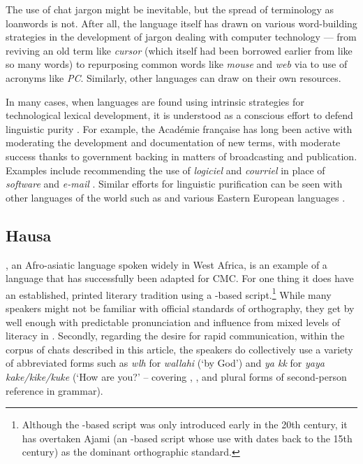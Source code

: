 \documentclass[output=paper
,newtxmath
,modfonts
,nonflat]{langsci/langscibook}
\begin{document}
The use of chat jargon might be inevitable, but the spread of terminology as loanwords is not. After all, the  language itself has drawn on various word-building strategies in the development of jargon dealing with computer technology — from reviving an old term like \textit{cursor} (which itself had been borrowed earlier from  like so many  words) to repurposing common words like \textit{mouse} and \textit{web} via  to use of acronyms like \textit{PC}. Similarly, other languages can draw on their own resources.

In many cases, when languages are found using intrinsic strategies for technological lexical development, it is understood as a conscious effort to defend linguistic purity \citep{blommaert2002,haspelmath2009}. For example, the Académie française has long been active with moderating the development and documentation of new  terms, with moderate success thanks to government backing in matters of broadcasting and publication. Examples include recommending the use of \textit{logiciel} and \textit{courriel} in place of \textit{software} and \textit{e-mail} \citep{daulton2012}. Similar efforts for linguistic purification can be seen with other languages of the world such as  and various Eastern European languages \citep{haspelmath2009}.

\subsection{Hausa}

, an Afro-asiatic language spoken widely in West Africa, is an example of a language that has successfully been adapted for CMC. For one thing it does have an established, printed literary tradition using a -based script.\footnote{Although the -based script was only introduced early in the 20th century, it has overtaken Ajami (an -based script whose use with  dates back to the 15th century) as the dominant orthographic standard.}  While many speakers might not be familiar with official standards of orthography, they get by well enough with predictable pronunciation and influence from mixed levels of literacy in . Secondly, regarding the desire for rapid communication, within the corpus of  chats described in this article, the  speakers do collectively use a variety of abbreviated forms such as \textit{wlh} for \textit{wallahi} (‘by God’) and \textit{ya kk} for \textit{yaya kake/kike/kuke} (‘How are you?’ – covering , , and plural forms of second-person reference in  grammar).
\end{document}
